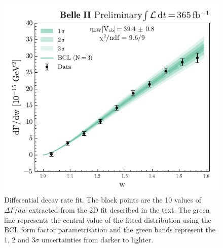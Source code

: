 \documentclass{moriond}
\begin{document}
\begin{figure}[h!]
    \centering
    \includegraphics[scale=0.9]{bcl_fit.pdf}
    \caption{Differential decay rate fit. The black points are the 10 values of $\Delta\Gamma/dw$ extracted from the 2D fit described in the text. The green line represents the central value of the fitted distribution using the BCL form factor parametrisation and the green bands represent the 1, 2 and 3$\sigma$ uncertainties from darker to lighter.}
    \label{fig:bcl_fit}
\end{figure}
\end{document}
